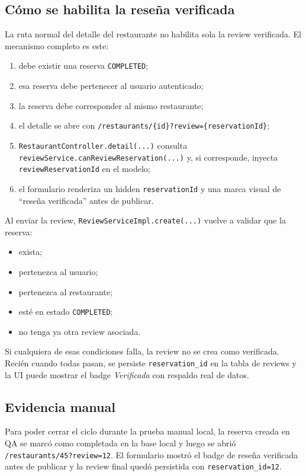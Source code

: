 \documentclass[11pt,a4paper]{report}
\newcommand{\code}[1]{\nolinkurl{#1}}
\begin{document}
\subsection{C\'omo se habilita la rese\~na verificada}

La ruta normal del detalle del restaurante no habilita sola la review verificada. El mecanismo completo es este:

\begin{enumerate}
  \item debe existir una reserva \code{COMPLETED};
  \item esa reserva debe pertenecer al usuario autenticado;
  \item la reserva debe corresponder al mismo restaurante;
  \item el detalle se abre con \code{/restaurants/\{id\}?review=\{reservationId\}};
  \item \code{RestaurantController.detail(...)} consulta \code{reviewService.canReviewReservation(...)} y, si corresponde, inyecta \code{reviewReservationId} en el modelo;
  \item el formulario renderiza un hidden \code{reservationId} y una marca visual de ``rese\~na verificada'' antes de publicar.
\end{enumerate}

Al enviar la review, \code{ReviewServiceImpl.create(...)} vuelve a validar que la reserva:

\begin{itemize}
  \item exista;
  \item pertenezca al usuario;
  \item pertenezca al restaurante;
  \item est\'e en estado \code{COMPLETED};
  \item no tenga ya otra review asociada.
\end{itemize}

Si cualquiera de esas condiciones falla, la review no se crea como verificada. Reci\'en cuando todas pasan, se persiste \code{reservation\_id} en la tabla de reviews y la UI puede mostrar el badge \emph{Verificada} con respaldo real de datos.

\subsection{Evidencia manual}

Para poder cerrar el ciclo durante la prueba manual local, la reserva creada en QA se marc\'o como completada en la base local y luego se abri\'o \code{/restaurants/45?review=12}. El formulario mostr\'o el badge de rese\~na verificada antes de publicar y la review final qued\'o persistida con \code{reservation\_id=12}.
\end{document}

